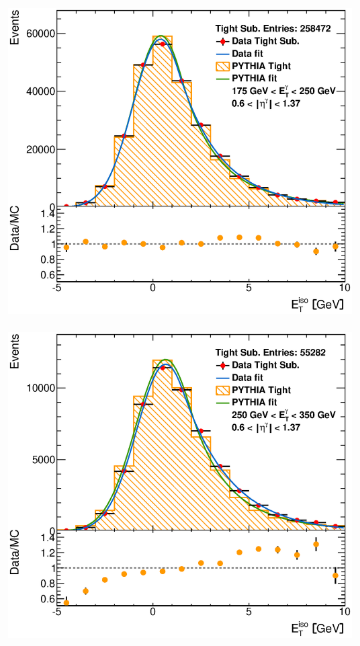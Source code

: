 \documentclass[12pt, twoside]{article}
\numberwithin{equation}{section}
\numberwithin{figure}{section}
\newenvironment{changemargin}[2]{%
\begin{list}{}{%
\setlength{\topsep}{0pt}%
\setlength{\leftmargin}{#1}%
\setlength{\rightmargin}{#2}%
\setlength{\listparindent}{\parindent}%
\setlength{\itemindent}{\parindent}%
\setlength{\parsep}{\parskip}%
}%
\item[]}{\end{list}}
\begin{document}
\begin{figure}[H]
\begin{changemargin}{-1.0cm}{-0.75cm}
\begin{changemargin}{-0.75cm}{-1.0cm}
\begin{subfigure}[b]{0.27\textwidth}
        \end{subfigure}
        \begin{subfigure}[b]{0.27\textwidth}
            \includegraphics[width=\textwidth]{./images/EtISOCorrection/T_MC_FITS-22(10GeV)(After).eps}
        \end{subfigure}
        \begin{subfigure}[b]{0.27\textwidth}
            \includegraphics[width=\textwidth]{./images/EtISOCorrection/T_MC_FITS-23(10GeV)(After).eps}
        \end{subfigure}


\end{changemargin}
\end{changemargin}
\end{figure}
\end{document}

